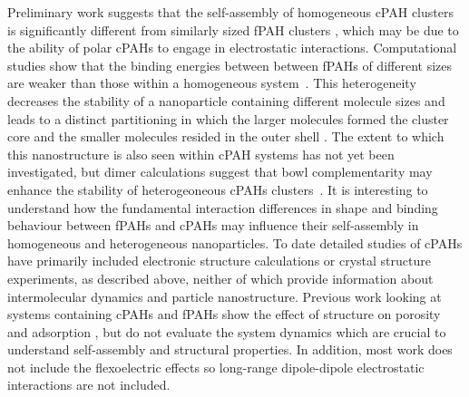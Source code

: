 Preliminary work suggests that the self-assembly of homogeneous cPAH clusters is significantly different from similarly sized fPAH clusters \cite{bowal2019ion}, which may be due to the ability of polar cPAHs to engage in electrostatic interactions. Computational studies show that the binding energies between between fPAHs of different sizes are weaker than those within a homogeneous system~\cite{Rapacioli2005stacked}. This heterogeneity decreases the stability of a nanoparticle containing different molecule sizes and leads to a distinct partitioning in which the larger molecules formed the cluster core and the smaller molecules resided in the outer shell \cite{bowal2018partitioning}. The extent to which this nanostructure is also seen within cPAH systems has not yet been investigated, but dimer calculations suggest that bowl complementarity may enhance the stability of heterogeoneous cPAHs clusters~\cite{Cabaleiro-Lago2018}. It is interesting to understand how the fundamental interaction differences in shape and binding behaviour between fPAHs and cPAHs may influence their self-assembly in homogeneous and heterogeneous nanoparticles. To date detailed studies of cPAHs have primarily included electronic structure calculations or crystal structure experiments, as described above, neither of which provide information about intermolecular dynamics and particle nanostructure.
Previous work looking at systems containing cPAHs and fPAHs show the effect of structure on porosity and adsorption \cite{zhang2020molecular,demir2016adsorption}, but do not evaluate the system dynamics which are crucial to understand self-assembly and structural properties. In addition, most work does not include the flexoelectric effects so long-range dipole-dipole electrostatic interactions are not included.
%

